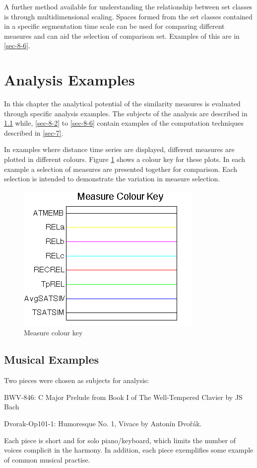 \documentclass{article}
\begin{document}
A further method available for understanding the relationship between
set classes is through multidimensional scaling. Spaces formed from
the set classes contained in a specific segmentation time scale can be
used for comparing different measures and can aid the selection of
comparison set. Examples of this are in \ref{sec-8-6}.

\section{Analysis Examples}
\label{sec-8}

In this chapter the analytical potential of the similarity measures is
evaluated through specific analysis examples. The subjects of the
analysis are described in \ref{sec-8-1} while, \ref{sec-8-2}
to \ref{sec-8-6} contain examples of the computation techniques
described in \ref{sec-7}.

In examples where distance time series are displayed, different
measures are plotted in different colours. Figure \ref{fig:colourkey}
shows a colour key for these plots. In each example a selection of
measures are presented together for comparison. Each selection is
intended to demonstrate the variation in measure selection.
\begin{figure}[htb]
\centering
\includegraphics[width=.2\linewidth]{./plots/colourkey.png}
\caption{\label{fig:colourkey}Measure colour key}
\end{figure}
\subsection{Musical Examples}
\label{sec-8-1}

Two pieces were chosen as subjects for analysis:
\begin{enumerate*}[label=\itshape\alph*\upshape)]
\item BWV-846: C Major Prelude from Book I of The Well-Tempered
Clavier by JS Bach
\item Dvorak-Op101-1: Humoresque No. 1, Vivace by Antonín Dvořák.
\end{enumerate*}
Each piece is short and for solo piano/keyboard, which limits the
number of voices complicit in the harmony. In addition, each piece
exemplifies some example of common musical practise.
\end{document}
